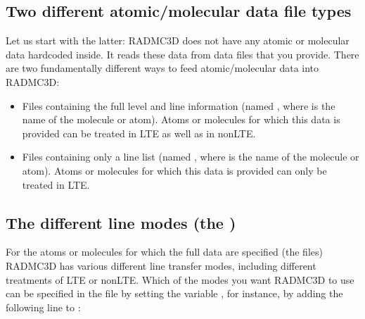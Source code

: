 \documentclass[letterpaper,10pt,english]{sphinxmanual}
\begin{document}
\subsection{Two different atomic/molecular data file types}
\label{\detokenize{lineradtrans:two-different-atomic-molecular-data-file-types}}
Let us start with the latter: RADMC\sphinxhyphen{}3D does not have any atomic or molecular
data hard\sphinxhyphen{}coded inside. It reads these data from data files that you provide.
There are two fundamentally different ways to feed atomic/molecular data into
RADMC\sphinxhyphen{}3D:
\begin{itemize}
\item {} 
Files containing the full level and line information (named , where  is the name of the molecule or
atom). Atoms or molecules for which this data is provided can be treated
in LTE as well as in non\sphinxhyphen{}LTE.

\item {} 
Files containing only a line list (named , where  is the name of the molecule or
atom). Atoms or molecules for which this data is provided can only be
treated in LTE.

\end{itemize}


\subsection{The different line modes (the )}
\label{\detokenize{lineradtrans:the-different-line-modes-the-lines-mode-parameter}}\label{\detokenize{lineradtrans:sec-lines-mode}}
For the atoms or molecules for which the full data are specified (the
 files) RADMC\sphinxhyphen{}3D has various different line
transfer modes, including different treatments of LTE or non\sphinxhyphen{}LTE. Which of
the modes you want RADMC\sphinxhyphen{}3D to use can be specified in the  file by setting the variable , for
instance, by adding the following line to :

\begin{sphinxVerbatim}[commandchars=\\\{\}]
  
\end{sphinxVerbatim}
\end{document}
